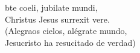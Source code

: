 \begin{cancion}%
	bte coeli, jubilate mundi,\\
Christus Jesus surrexit vere.\\
(Alegraos cielos, alégrate mundo,\\
 Jesucristo ha resucitado de verdad)\\
\end{cancion}%
